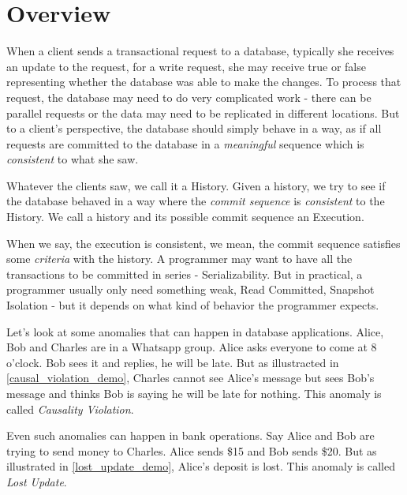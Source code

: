
\section{Overview}


When a client sends a transactional request to a database, typically she receives an update to the request, \eg for a write request, she may receive \textsf{true} or \textsf{false} representing whether the database was able to make the changes. To process that request, the database may need to do very complicated work - there can be parallel requests or the data may need to be replicated in different locations. But to a client's perspective, the database should simply behave in a way, as if all requests are committed to the database in a \textit{meaningful} sequence which is   \textit{consistent} to what she saw.

Whatever the clients saw, we call it a History. Given a history, we try to see if the database behaved in a way where the \textit{commit sequence} is \textit{consistent} to the History. We call a history and its possible commit sequence an Execution.

When we say, the execution is consistent, we mean, the commit sequence satisfies some \textit{criteria} with the history. A programmer may want to have all the transactions to be committed in series - Serializability. But in practical, a programmer usually only need something weak, \eg Read Committed, Snapshot Isolation - but it depends on what kind of behavior the programmer expects.




Let's look at some anomalies that can happen in database applications. Alice, Bob and Charles are in a Whatsapp group. Alice asks everyone to come at 8 o'clock. Bob sees it and replies, he will be late. But as illustracted in \ref{causal_violation_demo}, Charles cannot see Alice's message but sees Bob's message and thinks Bob is saying he will be late for nothing. This anomaly is called \textit{Causality Violation}.

Even such anomalies can happen in bank operations. Say Alice and Bob are trying to send money to Charles. Alice sends \$15 and Bob sends \$20. But as illustrated in \ref{lost_update_demo}, Alice's deposit is lost. This anomaly is called \textit{Lost Update}.

